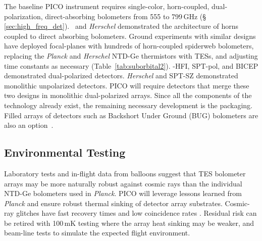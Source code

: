 The baseline PICO instrument requires single-color, horn-coupled, dual-polarization, direct-absorbing bolometers from 555 to 799\,GHz (\S\,\ref{sec:high_freq_det}).  \planck\ and \textit{Herschel} demonstrated the architecture of horns coupled to direct absorbing bolometers. 
Ground experiments with similar designs have deployed focal-planes with hundreds of horn-coupled spiderweb bolometers, replacing the \textit{Planck} and \textit{Herschel} NTD-Ge thermistors with TESs, and adjusting time constants as necessary (Table~\ref{tab:suborbital2}). \planck -HFI, SPT-pol, and BICEP demonstrated dual-polarized detectors. \textit{Herschel} and SPT-SZ demonstrated monolithic unpolarized detectors. PICO will require detectors that merge these two designs in monolithic dual-polarized arrays. Since all the components of the technology already exist, the remaining necessary development is the packaging. Filled arrays of detectors such as Backshort Under Ground (BUG) bolometers are also an option~\citep{Staguhn2006}.




\subsection{Environmental Testing}
\label{sec:env_testing}


Laboratory tests and in-flight data from balloons suggest that TES
bolometer arrays may be more naturally robust against cosmic rays than
the individual NTD-Ge bolometers used in \textit{Planck}. PICO will leverage lessons
learned from \textit{Planck} and ensure robust thermal sinking of
detector array substrates. Cosmic-ray
glitches have fast recovery times and low coincidence rates
\citep{SPIDER2018,Filippini_inprep}. Residual risk can be retired with 100\,mK
testing where the array heat sinking may be weaker, and beam-line
tests to simulate the expected flight environment.

